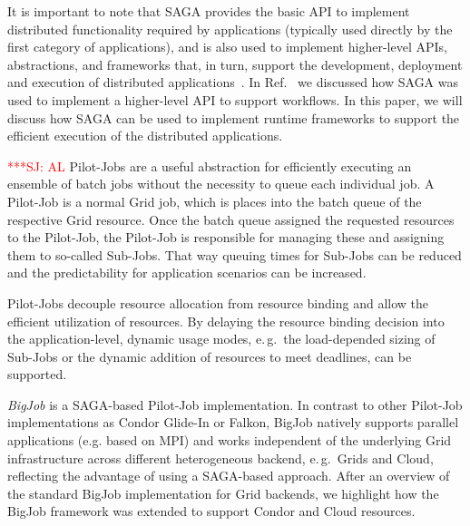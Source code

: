 \documentclass[conference,final]{IEEEtran}
\newcommand{\jhanote}[1]{ {\textcolor{red} { ***SJ: #1 }}}
\newcommand{\jhanote}[1]{}
\begin{document}
It is important to note that SAGA provides the basic API to
implement distributed functionality required by applications
(typically used directly by the first category of applications),
and is also used to implement higher-level APIs, abstractions, and
frameworks that, in turn, support the development, deployment and
execution of distributed
applications~\cite{gmac09,saga_data_intensive_abstractions}. In
Ref.~\cite{sagamontage09} we discussed how SAGA was used to
implement a higher-level API to support workflows. In this paper, 
we will discuss how SAGA can be used to implement runtime
frameworks to support the efficient execution of the distributed
applications.


 \jhanote{AL}
Pilot-Jobs are a useful abstraction for efficiently executing an
ensemble of batch jobs without the necessity to queue each individual
job. A Pilot-Job is a normal Grid job, which is places into the batch
queue of the respective Grid resource. Once the batch queue assigned
the requested resources to the Pilot-Job, the Pilot-Job is responsible
for managing these and assigning them to so-called Sub-Jobs.  That way
queuing times for Sub-Jobs can be reduced and the predictability for
application scenarios can be increased.


Pilot-Jobs decouple resource allocation from resource binding and
allow the efficient utilization of resources. By delaying the resource
binding decision into the application-level, dynamic usage modes,
e.\,g.\ the load-depended sizing of Sub-Jobs or the dynamic addition
of resources to meet deadlines, can be supported.

\emph{BigJob} is a SAGA-based Pilot-Job implementation. In contrast to other
Pilot-Job implementations as Condor Glide-In or Falkon, BigJob
natively supports parallel applications (e.g. based on MPI) and works
independent of the underlying Grid infrastructure across different
heterogeneous backend, e.\,g.\ Grids and Cloud, reflecting the
advantage of using a SAGA-based approach. After an overview of the
standard BigJob implementation for Grid backends, we highlight how the
BigJob framework was extended to support Condor and Cloud resources.
\end{document}

